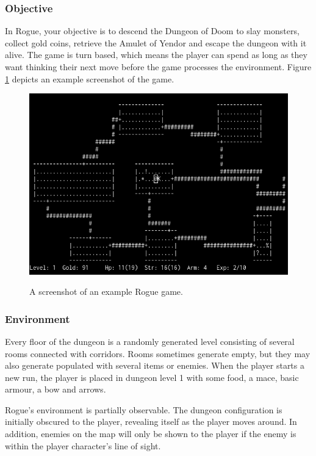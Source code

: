 \documentclass[11pt,a4paper]{article}
\begin{document}
    \subsubsection{Objective}
    In Rogue, your objective is to descend the Dungeon of Doom to slay monsters, collect gold coins, retrieve the Amulet of Yendor and escape the dungeon with it alive.
    The game is turn based, which means the player can spend as long as they want thinking their next move before the game processes the environment. Figure \ref{rogsc} depicts an example screenshot of the game.

    \begin{figure}[t]
        \caption{A screenshot of an example Rogue game.}
        \centering
        \includegraphics[scale=0.5]{rogue_screenshot}
        \label{rogsc}
    \end{figure}
    \subsubsection{Environment}
    Every floor of the dungeon is a randomly generated level consisting of several rooms connected with corridors.
    Rooms sometimes generate empty, but they may also generate populated with several items or enemies.
    When the player starts a new run, the player is placed in dungeon level 1 with some food, a mace, basic armour, a bow and arrows.

    Rogue's environment is partially observable.
    The dungeon configuration is initially obscured to the player, revealing itself as the player moves around.
    In addition, enemies on the map will only be shown to the player if the enemy is within the player character's line of sight.
\end{document}
